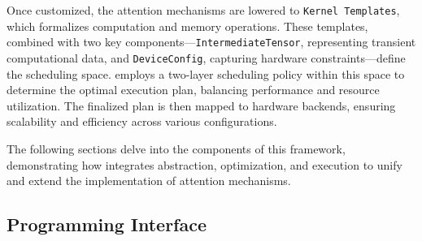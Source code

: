 Once customized, the attention mechanisms are lowered to \texttt{Kernel Templates}, which formalizes computation and memory operations. These templates, combined with two key components—\texttt{IntermediateTensor}, representing transient computational data, and \texttt{DeviceConfig}, capturing hardware constraints—define the scheduling space. \oursys{} employs a two-layer scheduling policy within this space to determine the optimal execution plan, balancing performance and resource utilization. The finalized plan is then mapped to hardware backends, ensuring scalability and efficiency across various configurations.

The following sections delve into the components of this framework, demonstrating how \oursys{} integrates abstraction, optimization, and execution to unify and extend the implementation of attention mechanisms.



\subsection{Programming Interface}


